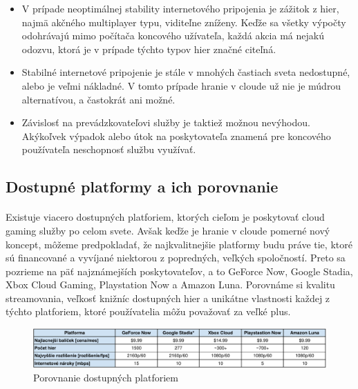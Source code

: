 \documentclass[10pt,twoside,slovak,a4paper]{article}
\begin{document}
\begin{itemize}

\item V prípade neoptimálnej stability internetového pripojenia je zážitok z hier, najmä akčného multiplayer typu, viditeľne zníženy. Keďže sa všetky výpočty odohrávajú mimo počítača koncového užívateľa, každá akcia má nejakú odozvu, ktorá je v prípade týchto typov hier značné citeľná.

\item Stabilné internetové pripojenie je stále v mnohých častiach sveta nedostupné, alebo je veľmi nákladné. V tomto prípade hranie v cloude už nie je múdrou alternatívou, a častokrát ani možné.

\item Závislosť na prevádzkovateľovi služby je taktiež možnou nevýhodou. Akýkoľvek výpadok alebo útok na poskytovateľa znamená pre koncového používateľa neschopnosť službu využívať.

\end{itemize}



\subsection{Dostupné platformy a ich porovnanie}

\paragraph{} Existuje viacero dostupných platforiem, ktorých cieľom je poskytovať cloud gaming služby po celom svete. Avšak keďže je hranie v cloude pomerné nový koncept, môžeme predpokladať, že najkvalitnejšie platformy budu práve tie, ktoré sú financované a vyvíjané niektorou z popredných, veľkých spoločností. Preto sa pozrieme na päť najznámejších poskytovateľov, a to GeForce Now, Google Stadia, Xbox Cloud Gaming, Playstation Now a Amazon Luna. Porovnáme si kvalitu streamovania, veľkosť knižníc dostupných hier a unikátne vlastnosti každej z týchto platforiem, ktoré používatelia môžu považovať za veľké plus. \cite{geforce-now}\cite{stadia}\cite{xbox-cloud}\cite{playstation-now}\cite{amazon-luna}

\begin{figure}[H]
	\includegraphics[width=1.0\textwidth]{cloud-gaming-tabulka-crop.pdf}
	\caption{Porovnanie dostupných platforiem \cite{geforce-now}\cite{stadia}\cite{xbox-cloud}\cite{playstation-now}\cite{amazon-luna}}
	\label{fig:comparison-table}
\end{figure}
\end{document}
